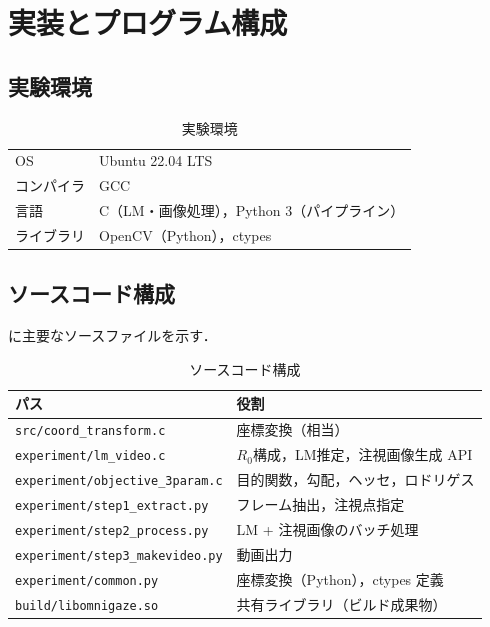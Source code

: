 \documentclass{ltjsarticle}          %
\begin{document}
\section{実装とプログラム構成}
\subsection{実験環境}
\begin{table}[H]
  \centering
  \caption{実験環境}
  \label{tab:environment}
  \begin{tabular}{l|l}
    \hline
    OS & Ubuntu 22.04 LTS \\
    コンパイラ & GCC \\
    言語 & C（LM・画像処理），Python 3（パイプライン） \\
    ライブラリ & OpenCV（Python），ctypes \\
    \hline
  \end{tabular}
\end{table}

\subsection{ソースコード構成}
に主要なソースファイルを示す．

\begin{table}[H]
  \centering
  \caption{ソースコード構成}
  \label{tab:source_tree}
  \begin{tabular}{l|p{9cm}}
    \hline
    パス & 役割 \\
    \hline
    \texttt{src/coord\_transform.c} & 座標変換（{sec:coord}相当） \\
    \texttt{experiment/lm\_video.c} & $R_0$構成，LM推定，注視画像生成 API \\
    \texttt{experiment/objective\_3param.c} & 目的関数，勾配，ヘッセ，ロドリゲス \\
    \texttt{experiment/step1\_extract.py} & フレーム抽出，注視点指定 \\
    \texttt{experiment/step2\_process.py} & LM + 注視画像のバッチ処理 \\
    \texttt{experiment/step3\_makevideo.py} & 動画出力 \\
    \texttt{experiment/common.py} & 座標変換（Python），ctypes 定義 \\
    \texttt{build/libomnigaze.so} & 共有ライブラリ（ビルド成果物） \\
    \hline
  \end{tabular}
\end{table}
\end{document}
